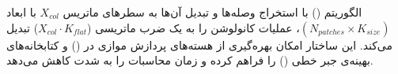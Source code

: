 \begin{tipbox}
الگوریتم () با استخراج وصله‌ها و تبدیل آن‌ها به سطر‌های ماتریس $X_{col}$ با ابعاد $(N_{patches} \times K_{size})$، عملیات کانولوشن را به یک ضرب ماتریسی ($X_{col} \cdot K_{flat}$) تبدیل می‌کند. این ساختار امکان بهره‌گیری از هسته‌های پردازش موازی در () و کتابخانه‌های بهینه‌ی جبر خطی () را فراهم کرده و زمان محاسبات را به شدت کاهش می‌دهد.
\end{tipbox}
